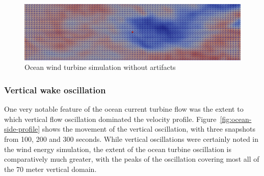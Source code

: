 \begin{figure}
\centering
\includegraphics[width=\textwidth]{images/OceanMeshRefinement}
\caption{Ocean wind turbine simulation without artifacts}
\label{fig:OceanMeshRefinement}
\end{figure}



\subsubsection{Vertical wake oscillation}

One very notable feature of the ocean current turbine flow was the extent to which vertical flow oscillation dominated the velocity profile. Figure~\ref{fig:ocean-side-profile} shows the movement of the vertical oscillation, with three snapshots from 100, 200 and 300 seconds. While vertical oscillations were certainly noted in the wind energy simulation, the extent of the ocean turbine oscillation is comparatively much greater, with the peaks of the oscillation covering most all of the 70 meter vertical domain.


